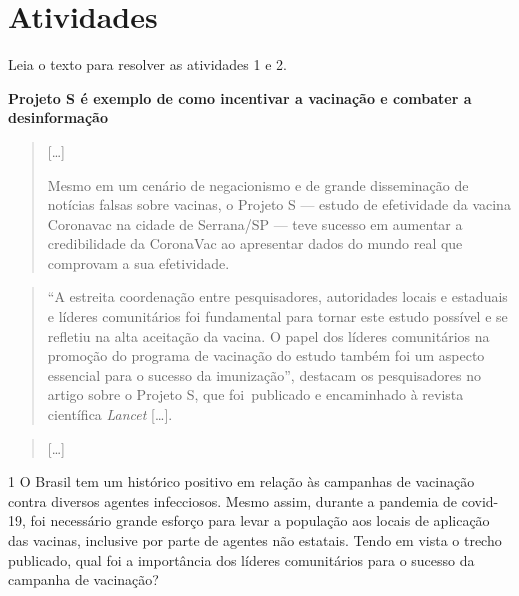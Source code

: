 \section{Atividades}

Leia o texto para resolver as atividades 1 e 2.

\textbf{Projeto S é exemplo de como incentivar a vacinação e combater a desinformação}

\begin{quote}
{[}\ldots{}{]}

Mesmo em um cenário de negacionismo e de grande disseminação de notícias
falsas sobre vacinas, o Projeto S --- estudo de efetividade da vacina
Coronavac na cidade de Serrana/SP --- teve sucesso em aumentar a
credibilidade da CoronaVac ao apresentar dados do mundo real que
comprovam a sua efetividade.
\end{quote}

\begin{quote}
``A estreita coordenação entre pesquisadores, autoridades locais e
estaduais e líderes comunitários foi fundamental para tornar este estudo
possível e se refletiu na alta aceitação da vacina. O papel dos líderes
comunitários na promoção do programa de vacinação do estudo também foi
um aspecto essencial para o sucesso da imunização'', destacam os
pesquisadores no artigo sobre o Projeto S, que foi~publicado e
encaminhado à revista científica \emph{Lancet} {[}\ldots{}{]}.
\end{quote}

\begin{quote}
{[}\ldots{}{]}
\end{quote}


\num{1} O Brasil tem um histórico positivo em relação às campanhas de
vacinação contra diversos agentes infecciosos. Mesmo assim, durante a
pandemia de covid-19, foi necessário grande esforço para levar a
população aos locais de aplicação das vacinas, inclusive por parte de
agentes não estatais. Tendo em vista o trecho publicado, qual foi a
importância dos líderes comunitários para o sucesso da campanha de
vacinação?


